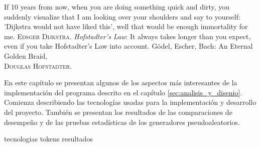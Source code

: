 %
%
%

{
  \epigrafe
  {%
    If 10 years from now, when you are doing something quick and dirty, you
    suddenly visualize that I am looking over your shoulders and say to
    yourself: 'Dijkstra would not have liked this', well that would be enough
    immortality for me.%
  }
  {%
     \textsc{Edsger Dijkstra}.%
  }
  \epigrafe
  {%
    \textit{Hofstadter's Law}: It always takes longer than you expect, even if
    you take Hofstadter's Law into account.
  }
  {%
     Gödel, Escher, Bach: An Eternal Golden Braid, \\
     \textsc{Douglas Hofstadter}.%
  }
}

\noindent
En este capítulo se presentan algunos de los aspectos más interesantes de
la implementación del programa descrito en el capítulo
\ref{sec:analisis_y_disenio}. Comienza describiendo las tecnologías
usadas para la implementación y desarrollo del proyecto. También se presentan
los resultados de las comparaciones de desempeño y de las pruebas estadísticas
de los generadores pseudoaleatorios.

{tecnologias}
{tokens}
{resultados}
